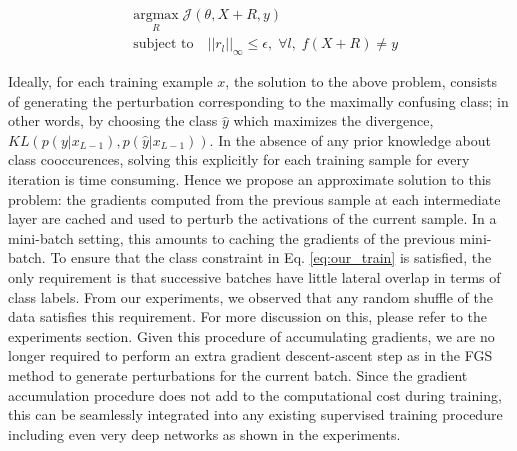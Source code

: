 \documentclass[letterpaper]{article} %
\begin{document}
\begin{equation}
\begin{aligned}
& \underset{R}{\text{argmax}} \; \mathcal{J}(\theta,X+R,y) \\
& \text{subject to} \quad ||r_{l}||_{\infty} \leq \epsilon, \; \forall l, \; f(X+R) \neq y
\label{eq:our_train}
\end{aligned}
\end{equation}

Ideally, for each training example $x$, the solution to the above problem, consists of generating the perturbation corresponding to the maximally confusing class; in other words, by choosing the class $\hat{y}$ which maximizes the divergence, $KL(p(y|x_{L-1}),p(\hat{y}|x_{L-1}))$.  In the absence of any prior knowledge about class cooccurences, solving this explicitly for each training sample for every iteration is time consuming. Hence we propose an approximate solution to this problem: the gradients computed from the previous sample at each intermediate layer are cached and used to perturb the activations of the current sample. In a mini-batch setting, this amounts to caching the gradients of the previous mini-batch. To ensure that the class constraint in Eq. \ref{eq:our_train} is satisfied, the only requirement is that successive batches have little lateral overlap in terms of class labels. From our experiments, we observed that any random shuffle of the data satisfies this requirement. For more discussion on this, please refer to the experiments section. Given this procedure of accumulating gradients, we are no longer required to perform an extra gradient descent-ascent step as in the FGS method to generate perturbations for the current batch. Since the gradient accumulation procedure does not add to the computational cost during training, this can be seamlessly integrated into any existing supervised training procedure including even very deep networks as shown in the experiments. 
\end{document}
